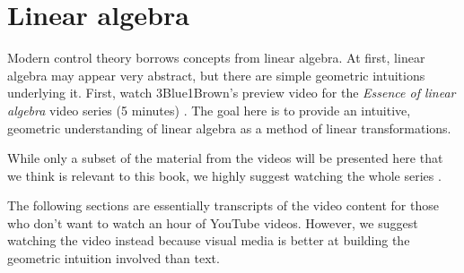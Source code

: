 
\chapter{Linear algebra}

Modern control theory borrows concepts from linear algebra. At first, linear
algebra may appear very abstract, but there are simple geometric intuitions
underlying it. First, watch 3Blue1Brown's preview video for the
\textit{Essence of linear algebra} video series (5 minutes)
\cite{bib:linalg_preview}. The goal here is to provide an intuitive, geometric
understanding of linear algebra as a method of linear transformations.

While only a subset of the material from the videos will be presented here that
we think is relevant to this book, we highly suggest watching the whole series
\cite{bib:essence_of_linalg}.

\begin{remark}
  The following sections are essentially transcripts of the video content for
  those who don't want to watch an hour of YouTube videos. However, we suggest
  watching the video instead because visual media is better at building the
  geometric intuition involved than text.
\end{remark}










